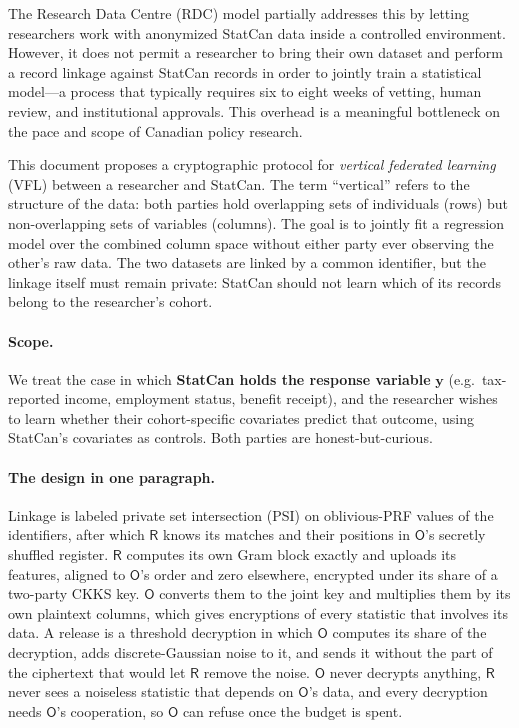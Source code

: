 \documentclass[11pt]{article}
\theoremstyle{definition}
\theoremstyle{plain}
\newcommand{\by}{\mathbf{y}}
\newcommand{\Party}[1]{\textsf{#1}}
\newcommand{\Rp}{\Party{R}}
\newcommand{\Op}{\Party{O}}
\begin{document}
The Research Data Centre (RDC) model partially addresses this by letting researchers work with anonymized StatCan data inside a controlled environment. However, it does not permit a researcher to bring their own dataset and perform a record linkage against StatCan records in order to jointly train a statistical model---a process that typically requires six to eight weeks of vetting, human review, and institutional approvals. This overhead is a meaningful bottleneck on the pace and scope of Canadian policy research.

This document proposes a cryptographic protocol for \emph{vertical federated learning} (VFL) between a researcher and StatCan. The term ``vertical'' refers to the structure of the data: both parties hold overlapping sets of individuals (rows) but non-overlapping sets of variables (columns). The goal is to jointly fit a regression model over the combined column space without either party ever observing the other's raw data. The two datasets are linked by a common identifier, but the linkage itself must remain private: StatCan should not learn which of its records belong to the researcher's cohort.

\paragraph{Scope.} We treat the case in which \textbf{StatCan holds the response variable} $\by$ (e.g.\ tax-reported income, employment status, benefit receipt), and the researcher wishes to learn whether their cohort-specific covariates predict that outcome, using StatCan's covariates as controls. Both parties are honest-but-curious.

\paragraph{The design in one paragraph.} Linkage is labeled private set intersection (PSI) on oblivious-PRF values of the identifiers, after which $\Rp$ knows its matches and their positions in $\Op$'s secretly shuffled register. $\Rp$ computes its own Gram block exactly and uploads its features, aligned to $\Op$'s order and zero elsewhere, encrypted under its share of a two-party CKKS key. $\Op$ converts them to the joint key and multiplies them by its own plaintext columns, which gives encryptions of every statistic that involves its data. A release is a threshold decryption in which $\Op$ computes its share of the decryption, adds discrete-Gaussian noise to it, and sends it without the part of the ciphertext that would let $\Rp$ remove the noise. $\Op$ never decrypts anything, $\Rp$ never sees a noiseless statistic that depends on $\Op$'s data, and every decryption needs $\Op$'s cooperation, so $\Op$ can refuse once the budget is spent.
\end{document}
